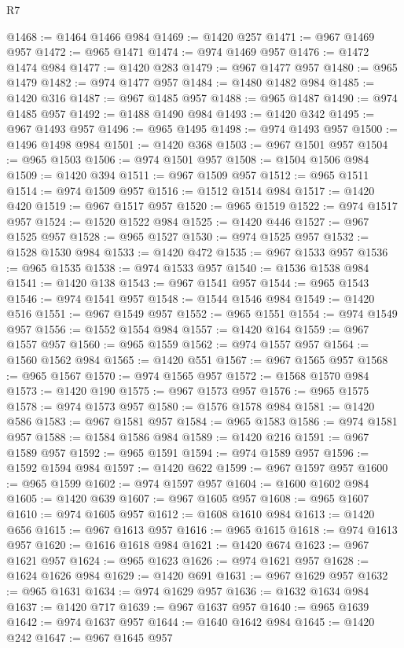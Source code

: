 \begin{lexlean}{R7}
\begin{coremodule}
@1468 := @1464 @1466 @984
@1469 := @1420 @257
@1471 := @967 @1469 @957
@1472 := @965 @1471
@1474 := @974 @1469 @957
@1476 := @1472 @1474 @984
@1477 := @1420 @283
@1479 := @967 @1477 @957
@1480 := @965 @1479
@1482 := @974 @1477 @957
@1484 := @1480 @1482 @984
@1485 := @1420 @316
@1487 := @967 @1485 @957
@1488 := @965 @1487
@1490 := @974 @1485 @957
@1492 := @1488 @1490 @984
@1493 := @1420 @342
@1495 := @967 @1493 @957
@1496 := @965 @1495
@1498 := @974 @1493 @957
@1500 := @1496 @1498 @984
@1501 := @1420 @368
@1503 := @967 @1501 @957
@1504 := @965 @1503
@1506 := @974 @1501 @957
@1508 := @1504 @1506 @984
@1509 := @1420 @394
@1511 := @967 @1509 @957
@1512 := @965 @1511
@1514 := @974 @1509 @957
@1516 := @1512 @1514 @984
@1517 := @1420 @420
@1519 := @967 @1517 @957
@1520 := @965 @1519
@1522 := @974 @1517 @957
@1524 := @1520 @1522 @984
@1525 := @1420 @446
@1527 := @967 @1525 @957
@1528 := @965 @1527
@1530 := @974 @1525 @957
@1532 := @1528 @1530 @984
@1533 := @1420 @472
@1535 := @967 @1533 @957
@1536 := @965 @1535
@1538 := @974 @1533 @957
@1540 := @1536 @1538 @984
@1541 := @1420 @138
@1543 := @967 @1541 @957
@1544 := @965 @1543
@1546 := @974 @1541 @957
@1548 := @1544 @1546 @984
@1549 := @1420 @516
@1551 := @967 @1549 @957
@1552 := @965 @1551
@1554 := @974 @1549 @957
@1556 := @1552 @1554 @984
@1557 := @1420 @164
@1559 := @967 @1557 @957
@1560 := @965 @1559
@1562 := @974 @1557 @957
@1564 := @1560 @1562 @984
@1565 := @1420 @551
@1567 := @967 @1565 @957
@1568 := @965 @1567
@1570 := @974 @1565 @957
@1572 := @1568 @1570 @984
@1573 := @1420 @190
@1575 := @967 @1573 @957
@1576 := @965 @1575
@1578 := @974 @1573 @957
@1580 := @1576 @1578 @984
@1581 := @1420 @586
@1583 := @967 @1581 @957
@1584 := @965 @1583
@1586 := @974 @1581 @957
@1588 := @1584 @1586 @984
@1589 := @1420 @216
@1591 := @967 @1589 @957
@1592 := @965 @1591
@1594 := @974 @1589 @957
@1596 := @1592 @1594 @984
@1597 := @1420 @622
@1599 := @967 @1597 @957
@1600 := @965 @1599
@1602 := @974 @1597 @957
@1604 := @1600 @1602 @984
@1605 := @1420 @639
@1607 := @967 @1605 @957
@1608 := @965 @1607
@1610 := @974 @1605 @957
@1612 := @1608 @1610 @984
@1613 := @1420 @656
@1615 := @967 @1613 @957
@1616 := @965 @1615
@1618 := @974 @1613 @957
@1620 := @1616 @1618 @984
@1621 := @1420 @674
@1623 := @967 @1621 @957
@1624 := @965 @1623
@1626 := @974 @1621 @957
@1628 := @1624 @1626 @984
@1629 := @1420 @691
@1631 := @967 @1629 @957
@1632 := @965 @1631
@1634 := @974 @1629 @957
@1636 := @1632 @1634 @984
@1637 := @1420 @717
@1639 := @967 @1637 @957
@1640 := @965 @1639
@1642 := @974 @1637 @957
@1644 := @1640 @1642 @984
@1645 := @1420 @242
@1647 := @967 @1645 @957

\end{coremodule}
\end{lexlean}
